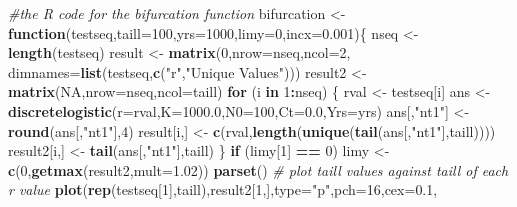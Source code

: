 \documentclass[
  lang=cn,
  11pt,
  scheme=chinese,
  chinesefont=nofont,
  citestyle=gb7714-2015,
  bibstyle=gb7714-2015]{elegantbook}
\newenvironment{Shaded}{\begin{snugshade}}{\end{snugshade}}
\newcommand{\AttributeTok}[1]{\textcolor[rgb]{0.13,0.29,0.53}{#1}}
\newcommand{\CommentTok}[1]{\textcolor[rgb]{0.56,0.35,0.01}{\textit{#1}}}
\newcommand{\ConstantTok}[1]{\textcolor[rgb]{0.56,0.35,0.01}{#1}}
\newcommand{\ControlFlowTok}[1]{\textcolor[rgb]{0.13,0.29,0.53}{\textbf{#1}}}
\newcommand{\DecValTok}[1]{\textcolor[rgb]{0.00,0.00,0.81}{#1}}
\newcommand{\FloatTok}[1]{\textcolor[rgb]{0.00,0.00,0.81}{#1}}
\newcommand{\FunctionTok}[1]{\textcolor[rgb]{0.13,0.29,0.53}{\textbf{#1}}}
\newcommand{\NormalTok}[1]{#1}
\newcommand{\OtherTok}[1]{\textcolor[rgb]{0.56,0.35,0.01}{#1}}
\newcommand{\SpecialCharTok}[1]{\textcolor[rgb]{0.81,0.36,0.00}{\textbf{#1}}}
\newcommand{\StringTok}[1]{\textcolor[rgb]{0.31,0.60,0.02}{#1}}
\begin{document}
\begin{Shaded}
\begin{Highlighting}[]
 \CommentTok{\#the R code for the bifurcation function  }
\NormalTok{bifurcation }\OtherTok{\textless{}{-}} \ControlFlowTok{function}\NormalTok{(testseq,}\AttributeTok{taill=}\DecValTok{100}\NormalTok{,}\AttributeTok{yrs=}\DecValTok{1000}\NormalTok{,}\AttributeTok{limy=}\DecValTok{0}\NormalTok{,}\AttributeTok{incx=}\FloatTok{0.001}\NormalTok{)\{  }
\NormalTok{  nseq }\OtherTok{\textless{}{-}} \FunctionTok{length}\NormalTok{(testseq)  }
\NormalTok{  result }\OtherTok{\textless{}{-}} \FunctionTok{matrix}\NormalTok{(}\DecValTok{0}\NormalTok{,}\AttributeTok{nrow=}\NormalTok{nseq,}\AttributeTok{ncol=}\DecValTok{2}\NormalTok{,  }
                  \AttributeTok{dimnames=}\FunctionTok{list}\NormalTok{(testseq,}\FunctionTok{c}\NormalTok{(}\StringTok{"r"}\NormalTok{,}\StringTok{"Unique Values"}\NormalTok{)))  }
\NormalTok{  result2 }\OtherTok{\textless{}{-}} \FunctionTok{matrix}\NormalTok{(}\ConstantTok{NA}\NormalTok{,}\AttributeTok{nrow=}\NormalTok{nseq,}\AttributeTok{ncol=}\NormalTok{taill)  }
  \ControlFlowTok{for}\NormalTok{ (i }\ControlFlowTok{in} \DecValTok{1}\SpecialCharTok{:}\NormalTok{nseq) \{    }
\NormalTok{     rval }\OtherTok{\textless{}{-}}\NormalTok{ testseq[i]  }
\NormalTok{     ans }\OtherTok{\textless{}{-}} \FunctionTok{discretelogistic}\NormalTok{(}\AttributeTok{r=}\NormalTok{rval,}\AttributeTok{K=}\FloatTok{1000.0}\NormalTok{,}\AttributeTok{N0=}\DecValTok{100}\NormalTok{,}\AttributeTok{Ct=}\FloatTok{0.0}\NormalTok{,}\AttributeTok{Yrs=}\NormalTok{yrs)  }
\NormalTok{     ans[,}\StringTok{"nt1"}\NormalTok{] }\OtherTok{\textless{}{-}} \FunctionTok{round}\NormalTok{(ans[,}\StringTok{"nt1"}\NormalTok{],}\DecValTok{4}\NormalTok{)  }
\NormalTok{     result[i,] }\OtherTok{\textless{}{-}} \FunctionTok{c}\NormalTok{(rval,}\FunctionTok{length}\NormalTok{(}\FunctionTok{unique}\NormalTok{(}\FunctionTok{tail}\NormalTok{(ans[,}\StringTok{"nt1"}\NormalTok{],taill))))  }
\NormalTok{     result2[i,] }\OtherTok{\textless{}{-}} \FunctionTok{tail}\NormalTok{(ans[,}\StringTok{"nt1"}\NormalTok{],taill)  }
\NormalTok{  \}    }
  \ControlFlowTok{if}\NormalTok{ (limy[}\DecValTok{1}\NormalTok{] }\SpecialCharTok{==} \DecValTok{0}\NormalTok{) limy }\OtherTok{\textless{}{-}} \FunctionTok{c}\NormalTok{(}\DecValTok{0}\NormalTok{,}\FunctionTok{getmax}\NormalTok{(result2,}\AttributeTok{mult=}\FloatTok{1.02}\NormalTok{))  }
  \FunctionTok{parset}\NormalTok{() }\CommentTok{\# plot taill values against taill of each r value  }
  \FunctionTok{plot}\NormalTok{(}\FunctionTok{rep}\NormalTok{(testseq[}\DecValTok{1}\NormalTok{],taill),result2[}\DecValTok{1}\NormalTok{,],}\AttributeTok{type=}\StringTok{"p"}\NormalTok{,}\AttributeTok{pch=}\DecValTok{16}\NormalTok{,}\AttributeTok{cex=}\FloatTok{0.1}\NormalTok{,  }

\end{Highlighting}
\end{Shaded}
\end{document}
